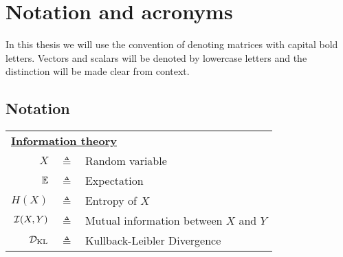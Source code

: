 \chapter*{Notation and acronyms}
In this thesis we will use the convention of denoting matrices with capital bold letters. Vectors and scalars will be denoted by lowercase letters and the distinction will be made clear from context.

\section*{Notation}
\begin{table}[H]%
\begin{center}%
\begin{tabular}{r c >{\raggedright\arraybackslash}p{10cm}}
\toprule
    \multicolumn{3}{l}{\textbf{\underline{Information theory}}} \\
$X$ & $\triangleq$ & Random variable\\
$\mathbb{E}$ & $\triangleq$ & Expectation\\
$H(X)$ & $\triangleq$ & Entropy of $X$\\
${\mathcal{I}}(X,Y)$ & $\triangleq$ & Mutual information between $X$ and $Y$\\
${\mathcal{D}}_{\mathrm{KL}}$ & $\triangleq$ & Kullback-Leibler Divergence \\


\end{tabular}
\end{center}
\end{table}
